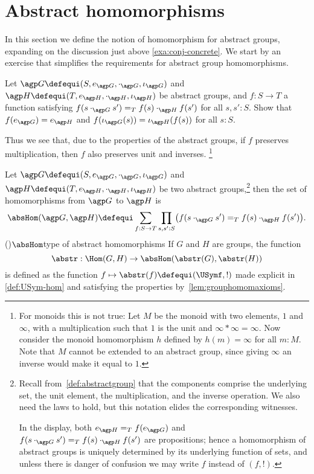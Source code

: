 \section{Abstract homomorphisms}\label{sec:abshom}

In this section we define the notion of homomorphism for
abstract groups, expanding on the discussion just above
\cref{exa:conj-concrete}. We start by an exercise
that simplifies the requirements for abstract group homomorphisms.

\begin{xca}\label{{xca:onlymult-hom}}
  Let $\agp G\defequi(S,e_{\agp G},\cdot_{\agp G},\iota_{\agp G})$
  and $\agp H\defequi(T,e_{\agp H},\cdot_{\agp H},\iota_{\agp H})$
  be abstract groups, and $f:S\to T$ a function satisfying
  $f(s\cdot_{\agp G}s')=_Tf(s)\cdot_{\agp H}f(s')$ for all $s,s':S$.
  Show that $f(e_{\agp G}) = e_{\agp H}$ and 
  $f(\iota_{\agp G}(s)) = \iota_{\agp H}(f(s))$ for all $s:S$.
\end{xca}

Thus we see that, due to the properties of the abstract groups,
if $f$ preserves multiplication, then $f$ also preserves unit and inverses.%
\footnote{\label{ft:monoid-hom}For monoids this is not true:
  Let $M$ be the monoid with two elements, $1$ and $\infty$,
  with a multiplication such that $1$ is the unit and
  $\infty*\infty=\infty$. Now consider the monoid homomorphism $h$
  defined by $h(m)=\infty$ for all $m:M$. Note that $M$ cannot
  be extended to an abstract group, since giving $\infty$
  an inverse would make it equal to $1$.}
  
\begin{definition}\label{def:abstrisfunctor}
  Let $\agp G\defequi(S,e_{\agp G},\cdot_{\agp G},\iota_{\agp G})$
  and $\agp H\defequi(T,e_{\agp H},\cdot_{\agp H},\iota_{\agp H})$
  be two abstract groups,\footnote{%
    Recall from~\cref{def:abstractgroup} that the components comprise
    the underlying set, the unit element, the multiplication,
    and the inverse operation. We also need the laws to hold, 
    but this notation elides the corresponding witnesses.

    In the display, both $e_{\agp H}=_T f(e_{\agp G})$ and
    $f(s\cdot_{\agp G}s')=_Tf(s)\cdot_{\agp H}f(s')$ are
    propositions; hence a homomorphism of abstract groups is uniquely determined
    by its underlying function of sets, and unless there is danger of
    confusion we may write $f$ instead of $(f,!)$.}
  then the set of homomorphisms from $\agp G$ to $\agp H$ is
  \[
    \absHom(\agp G,\agp H)
    \defequi\sum_{f:S\to T}
    \prod_{s,s':S}\bigl(f(s\cdot_{\agp G}s')=_Tf(s)\cdot_{\agp H}f(s')\bigr).
  \]
  \glossary(){$\protect\absHom$}{type of abstract homomorphisms}
  If $G$ and $H$ are groups, the function
  \[
    \abstr:\Hom(G,H)\to\absHom(\abstr(G),\abstr(H))
  \]
  is defined as the function $f\mapsto \abstr(f)\defequi(\USymf,!)$
  made explicit in \cref{def:USym-hom} and satisfying the
  properties by~\cref{lem:grouphomomaxioms}.
\end{definition}


